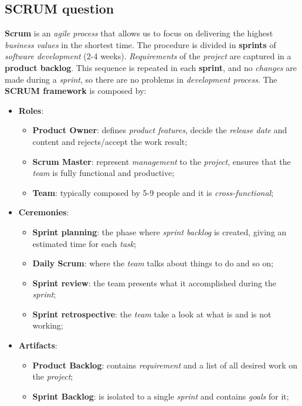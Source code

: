 \documentclass{article}
\begin{document}
\subsection{SCRUM question}
\textbf{Scrum} is an \emph{agile process} that allows us to focus on delivering the highest \emph{business values} in the shortest time. The procedure is divided in \textbf{sprints} of \emph{software development} (2-4 weeks). \emph{Requirements} of the \emph{project} are captured in a \textbf{product backlog}. 
This sequence is repeated in each \textbf{sprint}, and no \emph{changes} are made during a \emph{sprint}, so there are no problems in \emph{development process}. The \textbf{SCRUM framework} is composed by:
\begin{itemize}
\item \textbf{Roles}:
\begin{itemize}
\item \textbf{Product Owner}: defines \emph{product features}, decide the \emph{release date} and content and rejects/accept the work result;
\item \textbf{Scrum Master}: represent \emph{management} to the \emph{project}, ensures that the \emph{team} is fully functional and productive;
\item \textbf{Team}: typically composed by 5-9 people and it is \emph{cross-functional};
\end{itemize}
\item \textbf{Ceremonies}:
\begin{itemize}
\item \textbf{Sprint planning}: the phase where \emph{sprint backlog} is created, giving an estimated time for each \emph{task};
\item \textbf{Daily Scrum}: where the \emph{team} talks about things to do and so on;
\item \textbf{Sprint review}: the team presents what it accomplished during the \emph{sprint};
\item \textbf{Sprint retrospective}: the \emph{team} take a look at what is and is not working;
\end{itemize}
\item \textbf{Artifacts}:
\begin{itemize}
\item \textbf{Product Backlog}: contains \emph{requirement} and a list of all desired work on the \emph{project};
\item \textbf{Sprint Backlog}: is isolated to a single \emph{sprint} and contains \emph{goals} for it;
\end{itemize}
\end{itemize}
\end{document}
